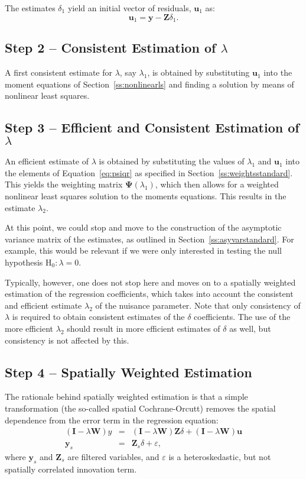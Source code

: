 \documentclass{article}
\begin{document}
The estimates $\delta_1$ yield an initial vector of residuals, $\mathbf{u}_1$ as:
\begin{equation*}
\mathbf{u}_1 = \mathbf{y} - \mathbf{Z} \delta_1.
\end{equation*}

\subsection{Step 2 -- Consistent Estimation of $\lambda$}
A first consistent estimate for $\lambda$, say $\lambda_1$, is obtained
by substituting $\mathbf{u}_1$ into the moment equations of Section~\ref{ss:nonlinearls}
and finding a solution by means of nonlinear least squares.

\subsection{Step 3 -- Efficient and Consistent Estimation of $\lambda$}
An efficient estimate of $\lambda$ is obtained by substituting the values
of $\lambda_1$ and $\mathbf{u}_1$ into the elements of
Equation~\ref{eq:psiqr} as specified in Section~\ref{ss:weightsstandard}.
This yields the weighting matrix $\mathbf{\Psi}(\lambda_1)$, which then allows for a 
weighted nonlinear least squares solution to the moments equations.
This results in the estimate $\lambda_2$.

At this point, we could stop and move to the construction of the asymptotic
variance matrix of the estimates, as outlined in Section~\ref{ss:asyvarstandard}.
For example, this would be relevant if we were only interested in testing
the null hypothesis $\mbox{H}_0: \lambda = 0$.

Typically, however, one does not stop here and moves on to a spatially weighted
estimation of the regression coefficients, which takes into account the consistent
and efficient estimate $\lambda_2$ of the nuisance parameter. Note that only 
consistency of $\lambda$ is required to obtain consistent estimates of the 
$\delta$ coefficients. The use of the more efficient $\lambda_2$ should result in
more efficient estimates of $\delta$ as well, but consistency is not affected by this.

\subsection{Step 4 -- Spatially Weighted Estimation}
The rationale behind spatially weighted estimation is that a simple transformation
(the so-called spatial Cochrane-Orcutt) removes the spatial dependence from
the error term in the regression equation:
\begin{eqnarray*}
(\mathbf{I} - \lambda \mathbf{W})y &=& (\mathbf{I} - \lambda \mathbf{W}) \mathbf{Z} \delta
+ (\mathbf{I} - \lambda \mathbf{W})\mathbf{u}\\
\mathbf{y}_s &=& \mathbf{Z}_s \delta + \varepsilon,
\end{eqnarray*}
where $\mathbf{y}_s$ and $\mathbf{Z}_s$ are filtered variables,
and $\varepsilon$ is a heteroskedastic, but not spatially correlated innovation term.
\end{document}
